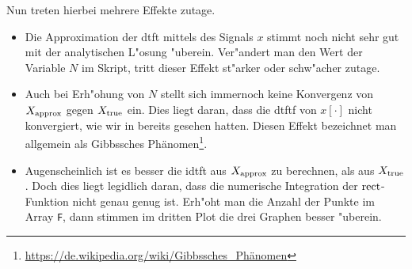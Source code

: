 Nun treten hierbei mehrere Effekte zutage.
\begin{itemize}
    \item Die Approximation der \gls{dtft} mittels des  Signals $x$ stimmt noch nicht sehr gut mit der analytischen L"osung "uberein. 
    Ver"andert man den Wert der Variable $N$ im Skript, tritt dieser Effekt st"arker oder schw"acher zutage.
    \item Auch bei Erh"ohung von $N$ stellt sich immernoch keine Konvergenz von $X_{\rm approx}$ gegen $X_{\rm true}$ ein.
    Dies liegt daran, dass die \gls{dtftf} von $x[\cdot]$ nicht konvergiert, wie wir in  bereits gesehen hatten.
    Diesen Effekt bezeichnet man allgemein als Gibbssches Phänomen\footnote{\url{https://de.wikipedia.org/wiki/Gibbssches_Phänomen}}.
    \item Augenscheinlich ist es besser die \gls{idtft} aus $X_{\rm approx}$ zu berechnen, als aus $X_{\rm true}$. Doch dies liegt legidlich daran, dass die numerische Integration der $\operatorname*{rect}$-Funktion nicht genau genug ist.
    Erh"oht man die Anzahl der Punkte im Array \texttt{F}, dann stimmen im dritten Plot die drei Graphen besser "uberein.
\end{itemize}
